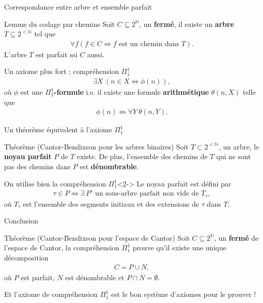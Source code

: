 \documentclass{beamer} %
\newcommand{\N}{\mathbb{N}}
\begin{document}
\begin{frame}{Correspondance entre arbre et ensemble parfait}
    \begin{block}{Lemme du codage par chemins}
        Soit $C \subseteq 2^{\N}$, un \textbf{fermé}, il existe un \textbf{arbre} $T \subseteq 2^{<\N}$ tel que \begin{align*}
        \forall f (f \in C \iff f \text{ est un chemin dans } T).
    \end{align*}
    L'arbre $T$ est parfait ssi $C$ aussi.
    \end{block}
\end{frame}

\begin{frame}{Un axiome plus fort ; compréhension $\Pi_1^1$}
    \begin{align*}
        \exists X \ (n \in X \Longleftrightarrow \phi(n) ),
    \end{align*}
    où $\phi$ est une \textbf{$\Pi_1^1$-formule} i.e. il existe une formule \textbf{arithmétique} $\theta(n,X)$ telle que \begin{align*}
        \phi(n) \Longleftrightarrow \forall Y \ \theta(n,Y).
    \end{align*}
\end{frame}

\begin{frame}{Un théorème équivalent à l'axiome $\Pi_1^1$}
    \begin{block}{Théorème (Cantor-Bendixson pour les arbres binaires)}
        Soit $T \subset 2^{<\N}$, un arbre, le \textbf{noyau parfait} $P$ de $T$ existe. De plus, l'ensemble des chemins de $T$ qui ne sont pas des chemins dans $P$ est \textbf{dénombrable}.
    \end{block}
    \begin{exampleblock}{On utilise bien la compréhension $\Pi_1^1$}<2->
    Le noyau parfait est défini par \begin{align*}
        \tau \in P \Longleftrightarrow \exists \ P' \text{ un sous-arbre parfait non vide de } T_{\tau},
    \end{align*}
    où $T_{\tau}$ est l'ensemble des segments initiaux et des extensions de $\tau$ dans $T$.
\end{exampleblock}
\end{frame}

\begin{frame}{Conclusion}
    \begin{block}{Théorème (Cantor-Bendixson pour l'espace de Cantor)}
        Soit $C \subseteq 2^{\N}$, un \textbf{fermé} de l'espace de Cantor, la compréhension $\Pi_1^1$ prouve qu'il existe une unique décomposition \begin{align*}
            C = P \cup N,
        \end{align*}
        où $P$ est parfait, $N$ est dénombrable et $P \cap N = \emptyset$.
    \end{block}
    \pause 
    Et l'axiome de compréhension $\Pi_1^1$ est le bon système d'axiomes pour le prouver !
\end{frame}
\end{document}
